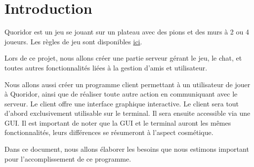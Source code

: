 \section{Introduction}

Quoridor est un jeu se jouant sur un plateau avec des pions et des murs à 2 ou 4 joueurs.
Les règles de jeu sont disponibles \href{http://www.gigamic.com/files/catalog/products/rules/quoridor-classic-fr.pdf}{ici}.

Lors de ce projet, nous allons créer une partie serveur gérant le jeu, le chat, et toutes autres fonctionnalités liées à la gestion d'amis et utilisateur.

Nous allons aussi créer un programme client permettant à un utilisateur de jouer à Quoridor, ainsi que de réaliser toute autre action en communiquant avec le serveur. Le client offre une interface graphique interactive. Le client sera tout d'abord exclusivement utilisable sur le terminal. Il sera ensuite accessible via une GUI. Il est important de noter que la GUI et le terminal auront les mêmes fonctionnalités, leurs différences se résumeront à l'aspect cosmétique.

Dans ce document, nous allons élaborer les besoins que nous estimons important pour l'accomplissement de ce programme.
